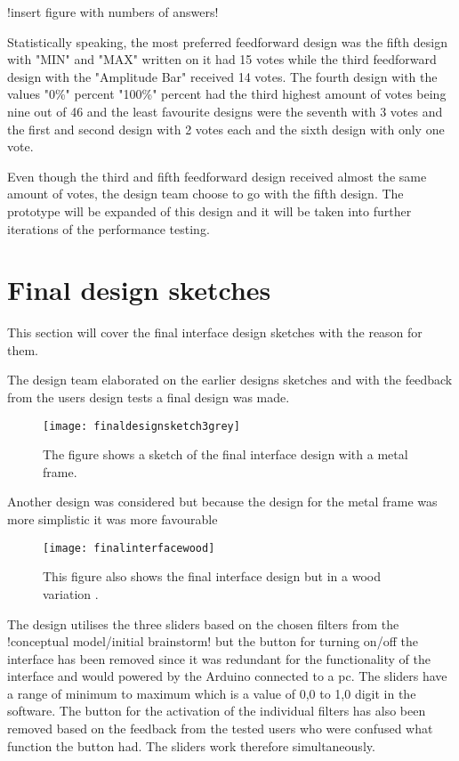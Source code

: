 !insert figure with numbers of answers!

Statistically speaking, the most preferred feedforward design was the fifth design with "MIN" and "MAX" written on it had 15 votes while the third feedforward design with the "Amplitude Bar"  received 14 votes. The fourth design with the values "0\%" percent "100\%" percent had the third highest amount of votes being nine out of 46 and the least favourite designs were the seventh with 3 votes and the first and second design with 2 votes each and the sixth design with only one vote. 

Even though the third and fifth feedforward design received almost the same amount of votes, the design team choose to go with the fifth design. The prototype will be expanded of this design and it will be taken into further iterations of the performance testing. 


\section{Final design sketches}
This section will cover the final interface design sketches with the reason for them.  

The design team elaborated on the earlier designs sketches and with the feedback from the users design tests a final design was made.

\begin{figure}[!h] 
\centering
\texttt{[image: finaldesignsketch3grey]}
\caption{\label{fig:inaldesignsketch3grey} The figure shows a sketch of the final interface design with a metal frame.}
\end{figure}

Another design was considered but because the design for the metal frame was more simplistic it was more favourable   


\begin{figure}[!h] 
\centering
\texttt{[image: finalinterfacewood]}
\caption{\label{fig:finalinterfacewood} This figure also shows the final interface design but in a wood variation .}
\end{figure} 

The design utilises the three sliders based on the chosen filters from the !conceptual model/initial brainstorm! but the button for turning on/off the interface has been removed since it was redundant for the functionality of the interface and would powered by the Arduino connected to a pc. The sliders have a range of minimum to maximum which is a value of 0,0 to 1,0 digit in the software. The button for the activation of the individual filters has also been removed based on the feedback from the tested users who were confused what function the button had. The sliders work therefore simultaneously.      
 
